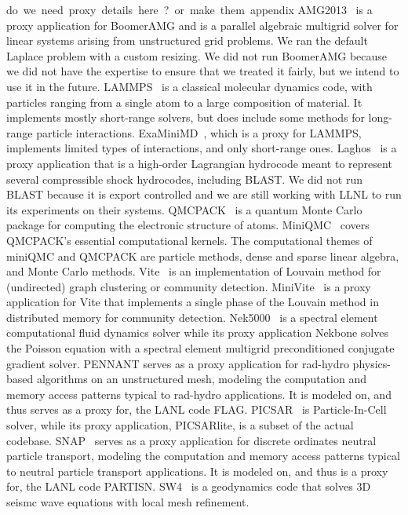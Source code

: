 \si{do we need proxy details here? or make them appendix}
AMG2013~\cite{AMG} is a proxy application for BoomerAMG and is a parallel
algebraic multigrid solver for linear systems arising from unstructured grid
problems.  We ran the default Laplace problem with a custom resizing.
We did not run BoomerAMG because we did not have the expertise to ensure that we treated it fairly, but we intend to use it in the future.
%
LAMMPS~\cite{LAMMPS} is a classical molecular dynamics code, with particles ranging from a single atom to a large composition of material.  It implements mostly short-range solvers, but does include some methods for long-range particle interactions.  
ExaMiniMD~\cite{ostiExaMiniMD}, which is a proxy for LAMMPS, implements limited types of interactions, and only short-range ones.
%
Laghos~\cite{Laghos} is a proxy application that is a high-order Lagrangian hydrocode meant to represent several compressible shock hydrocodes, including BLAST. We did not run BLAST because it is export controlled and we are still working with LLNL to run its experiments on their systems.
%
QMCPACK~\cite{qmcpack} is a quantum Monte Carlo package for computing the electronic structure of atoms. MiniQMC~\cite{richards2018fy18} covers QMCPACK's essential computational kernels. The computational themes of miniQMC and QMCPACK are particle methods, dense and sparse linear algebra, and Monte Carlo methods.
%
Vite~\cite{Vite} is an implementation of Louvain method for (undirected) graph clustering or community detection.
%
MiniVite~\cite{miniVite} is a proxy application for Vite that implements a single phase of the Louvain method in distributed memory for community
detection. 
%
Nek5000~\cite{Nek5000} is a spectral element computational fluid dynamics
solver while its proxy application Nekbone solves the Poisson equation with
a spectral element multigrid preconditioned conjugate gradient solver.  
%
PENNANT serves as a proxy application for rad-hydro physics-based algorithms on an unstructured mesh, modeling the computation and memory access patterns typical to rad-hydro applications. It is modeled on, and thus serves as a proxy for, the LANL code FLAG.
%
PICSAR~\cite{PICSAR} is Particle-In-Cell solver, while its proxy
application, PICSARlite, is a subset of the actual codebase.  
%
SNAP~\cite{snap} serves as a proxy application for discrete ordinates neutral particle transport, modeling the computation and memory access patterns typical to neutral particle transport applications. It is modeled on, and thus is a proxy for, the LANL code PARTISN.
%
SW4~\cite{SW42} is a geodynamics code that solves 3D seismc wave equations with local mesh refinement.
